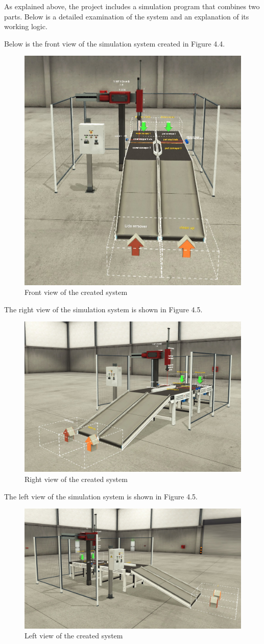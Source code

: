 As explained above, the project includes a simulation program that combines two parts. Below is a detailed examination of the system and an explanation of its working logic.

Below is the front view of the simulation system created in Figure 4.4.
\begin{figure}[H]
    \centering
    \includegraphics[width=0.5\columnwidth]{imgs/io/3.jpg}
    \caption[Front view of the created system]{Front view of the created system}
    \label{fig-magnitude}
\end{figure}%

The right view of the simulation system is shown in Figure 4.5.
\begin{figure}[H]
    \centering
    \includegraphics[width=0.5\columnwidth]{imgs/io/1.jpg}
    \caption[Right view of the created system]{Right view of the created system}
    \label{fig-magnitude}
\end{figure}%

The left view of the simulation system is shown in Figure 4.5.
\begin{figure}[H]
    \centering
    \includegraphics[width=0.5\columnwidth]{imgs/io/2.jpg}
    \caption[Left view of the created system]{Left view of the created system}
    \label{fig-magnitude}
\end{figure}%

